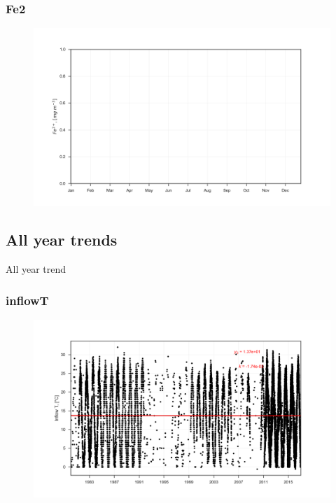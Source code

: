 \documentclass{beamer}
\begin{document}
\begin{frame}
\frametitle{Fe2}
\begin{figure}
\includegraphics[width=\textwidth]{rivers/all/1yr_boxpl/Fe2.png}
\end{figure}
\end{frame}


\subsection{All year trends}

\begin{frame}
\begin{center}
\Huge All year trend
\end{center}
\end{frame}


\begin{frame}
\frametitle{inflowT}
\begin{figure}
\includegraphics[width=\textwidth]{rivers/all/all_years/inflowT.png}
\end{figure}
\end{frame}
\end{document}
